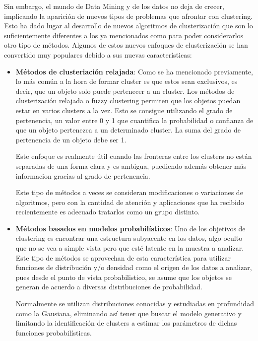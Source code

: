 \documentclass[10pt, a4paper]{article}
\begin{document}
Sin embargo, el mundo de Data Mining y de los datos no deja de crecer, implicando la aparición de nuevos tipos de problemas que afrontar con clustering. Esto ha dado lugar al desarrollo de nuevos algoritmos de clusterización que son lo suficientemente diferentes a los ya mencionados como para poder considerarlos otro tipo de métodos. Algunos de estos nuevos enfoques de clusterización se han convertido muy populares debido a sus nuevas características:

\begin{itemize}
  \item \textbf{Métodos de clusteriación relajada}: Como se ha mencionado previamente, lo más común a la hora de formar cluster es que estos sean exclusivos, es decir, que un objeto solo puede pertenecer a un cluster. Los métodos de clusterización relajada o fuzzy clustering  permiten que los objetos puedan estar en varios clusters a la vez. Esto se consigue utilizando el grado de pertenencia, un valor entre 0 y 1 que cuantifica la probabilidad o confianza de que un objeto pertenezca a un determinado cluster. La suma del grado de pertenencia de un objeto debe ser 1.
  
  Este enfoque es realmente útil cuando las fronteras entre los clusters no están separadas de una forma clara y es ambigua, puediendo además obtener más informacion gracias al grado de pertenencia. 
  
  Este tipo de métodos a veces se consideran modificaciones o variaciones de algoritmos, pero con la cantidad de atención y aplicaciones que ha recibido recientemente es adecuado tratarlos como un grupo distinto.
  
  \item \textbf{Métodos basados en modelos probabilísticos}: Uno de los objetivos de clustering es encontrar una estructura subyacente en los datos, algo oculto que no se vea a simple vista pero que esté latente en la muestra a analizar. Este tipo de métodos se aprovechan de esta característica para utilizar funciones de distribución y/o densidad como el origen de los datos a analizar, pues desde el punto de vista probabilistico, se asume que los objetos se generan de acuerdo a diversas distribuciones de probabilidad.
  
  Normalmente se utilizan distribuciones conocidas y estudiadas en profundidad como la Gausiana, eliminando así tener que buscar el modelo generativo y limitando la identificación de clusters a estimar los parámetros de dichas funciones probabilísticas.
  

\end{itemize}
\end{document}

